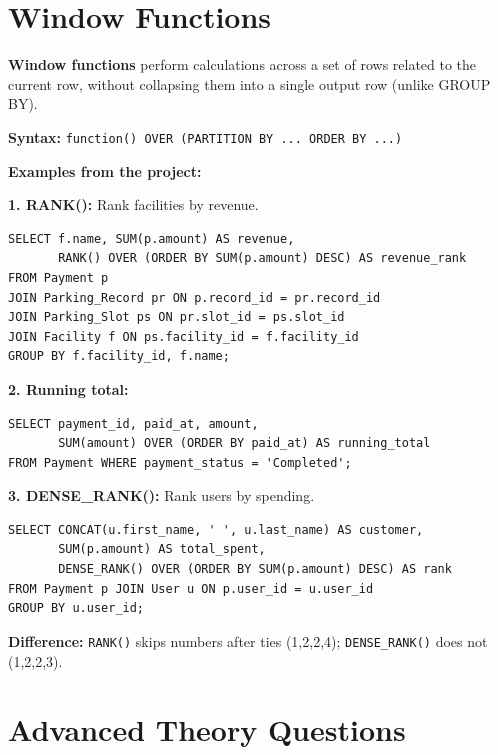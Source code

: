 \documentclass[12pt,a4paper]{article}
\begin{document}
\section{Window Functions}

\begin{questionbox}
\end{questionbox}
\begin{answerbox}
\textbf{Window functions} perform calculations across a set of rows related to the current row, without collapsing them into a single output row (unlike GROUP BY).

\textbf{Syntax:} \texttt{function() OVER (PARTITION BY ... ORDER BY ...)}

\textbf{Examples from the project:}

\textbf{1. RANK():} Rank facilities by revenue.
\begin{lstlisting}
SELECT f.name, SUM(p.amount) AS revenue,
       RANK() OVER (ORDER BY SUM(p.amount) DESC) AS revenue_rank
FROM Payment p
JOIN Parking_Record pr ON p.record_id = pr.record_id
JOIN Parking_Slot ps ON pr.slot_id = ps.slot_id
JOIN Facility f ON ps.facility_id = f.facility_id
GROUP BY f.facility_id, f.name;
\end{lstlisting}

\textbf{2. Running total:}
\begin{lstlisting}
SELECT payment_id, paid_at, amount,
       SUM(amount) OVER (ORDER BY paid_at) AS running_total
FROM Payment WHERE payment_status = 'Completed';
\end{lstlisting}

\textbf{3. DENSE\_RANK():} Rank users by spending.
\begin{lstlisting}
SELECT CONCAT(u.first_name, ' ', u.last_name) AS customer,
       SUM(p.amount) AS total_spent,
       DENSE_RANK() OVER (ORDER BY SUM(p.amount) DESC) AS rank
FROM Payment p JOIN User u ON p.user_id = u.user_id
GROUP BY u.user_id;
\end{lstlisting}

\textbf{Difference:} \texttt{RANK()} skips numbers after ties (1,2,2,4); \texttt{DENSE\_RANK()} does not (1,2,2,3).
\end{answerbox}

\section{Advanced Theory Questions}
\end{document}
